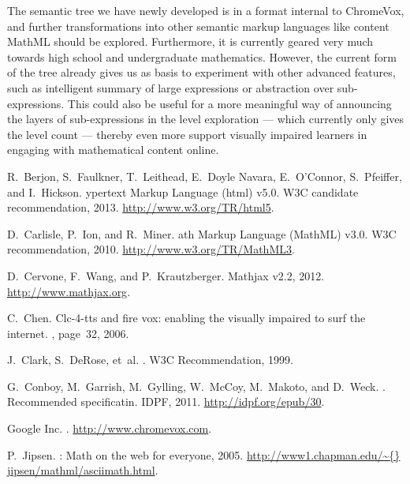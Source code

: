 \documentclass{sig-alternate}
\begin{document}
The semantic tree we have newly developed is in a format internal to ChromeVox,
and further transformations into other semantic markup languages like content
MathML should be explored. Furthermore, it is currently geared very much towards
high school and undergraduate mathematics.  However, the current form of the
tree already gives us as basis to experiment with other advanced features, such
as intelligent summary of large expressions or abstraction over
sub-expressions. This could also be useful for a more meaningful way of
announcing the layers of sub-expressions in the level exploration --- which
currently only gives the level count --- thereby even more support visually
impaired learners in engaging with mathematical content online.


%  
\begin{thebibliography}{10}

R.~Berjon, S.~Faulkner, T.~Leithead, E.~Doyle Navara, E.~O'Connor, S.~Pfeiffer, and I.~Hickson.
ypertext {M}arkup {L}anguage (html) v5.0.
\newblock W3C candidate recommendation, 2013.
\newblock \url{http://www.w3.org/TR/html5}.

D.~Carlisle, P.~Ion, and R.~Miner.
ath {M}arkup {L}anguage ({MathML}) v3.0. 
\newblock W3C recommendation, 2010. 
\newblock \url{http://www.w3.org/TR/MathML3}.

D.~Cervone, F.~Wang, and P.~Krautzberger.
\newblock Mathjax v2.2, 2012.
\newblock \url{http://www.mathjax.org}.

C.~Chen.
\newblock Clc-4-tts and fire vox: enabling the visually impaired to surf the
  internet.
, page~32, 2006.

J.~Clark, S.~DeRose, et~al.
.
\newblock W3C Recommendation,  1999.

G.~Conboy, M.~Garrish, M.~Gylling, W.~McCoy, M.~Makoto, and
  D.~Weck.
.
\newblock Recommended specificatin. IDPF, 2011.
\newblock \url{http://idpf.org/epub/30}.

{Google} Inc.
.
\newblock \url{http://www.chromevox.com}.

P.~Jipsen.
: Math on the web for everyone, 2005.
\newblock \url{http://www1.chapman.edu/\~{}
  jipsen/mathml/asciimath.html}.


\end{thebibliography}
\end{document}
